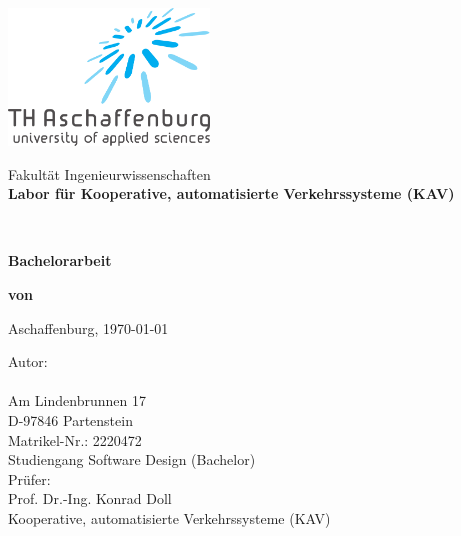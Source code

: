 \newpage
\thispagestyle{empty}

\begin{titlepage}

\begin{center}


\includegraphics[width=0.4\textwidth]{Bilder/thab_logo.png}
\vspace{1cm}

\normalsize Fakultät Ingenieurwissenschaften\\
\textbf{Labor für Kooperative, automatisierte Verkehrssysteme (KAV)}
\vspace{3cm}

\LARGE
\textbf{\Topic}\\
\vspace{2cm}

\large \textbf{Bachelorarbeit}
\vspace{1cm}

\textbf{von}
\vspace{1cm}

\textbf{\Author}
\vspace{5cm}

Aschaffenburg,  \today\\
\vspace*{\fill}

\end{center}


   \newpage
   \thispagestyle{empty}
   \begin{flushleft}
      \vspace*{3cm}
      \large
      \noindent Autor:\\
      \vspace{1ex}
      \Author\\
      Am Lindenbrunnen 17\\
      D-97846 Partenstein\\
      \vspace{1ex}
      Matrikel-Nr.: 2220472\\
      Studiengang Software Design (Bachelor)\\
      \vspace{10ex}
      \noindent Prüfer:\\
      \vspace{1ex}
      Prof.  Dr.-Ing. Konrad Doll\\
      Kooperative, automatisierte Verkehrssysteme (KAV)\\
      \vspace{5ex}
      


\end{flushleft}
\end{titlepage}
